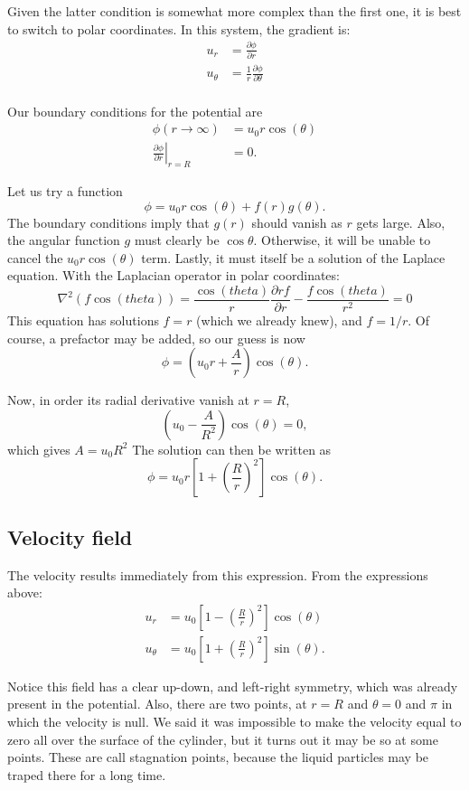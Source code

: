 Given the latter condition is somewhat more complex than the first
one, it is best to switch to polar coordinates. In
this system, the gradient is:
\begin{align}
u_r &= \frac{\partial\phi}{\partial r}\\
u_\theta &= \frac{1}{r} \frac{\partial\phi}{\partial \theta}\\
\end{align}


Our boundary conditions for the potential are
\begin{align}
  \phi(r \to \infty ) &=  u_0 r \cos(\theta)  \\
  \left. \frac{\partial\phi}{\partial r} \right|_{r = R } &= 0  .
\end{align}

Let us try a function
\[
\phi =  u_0 r \cos(\theta)  + f(r) g(\theta) .
\]
The boundary conditions imply that $g(r)$ should vanish as $r$ gets
large. Also, the angular function $g$ must clearly be
$\cos\theta$. Otherwise, it will be unable to cancel the $u_0
r \cos(\theta)$ term. Lastly, it must itself be a solution of the
Laplace equation. With the Laplacian operator in
polar coordinates:
\[
\nabla^2 (f \cos(theta ) ) =
\frac{ \cos(theta ) }{r} \frac{\partial r f}{\partial r} -
\frac{ f \cos(theta ) }{r^2} = 0
\]
This equation has solutions $f=r$ (which we already knew), and
$f=1/r$. Of course, a prefactor may be added, so our guess is now
\[
\phi = \left( u_0 r + \frac{A}{r} \right) \cos(\theta) .
\]

Now, in order its radial derivative vanish at $r=R$,
\[
 \left ( u_0  - \frac{A}{R^2} \right) \cos(\theta) = 0 ,
\]
which gives $A=u_0 R^2 $ The solution can then be written as
\[
\phi = u_0 r \left[ 1 + \left( \frac{R}{r}\right)^2 \right] \cos(\theta) .
\]

\subsection{Velocity field}

The velocity results immediately from this expression. From the
expressions above:
\begin{align}
u_r     &=   u_0  \left[ 1 - \left( \frac{R}{r}\right)^2 \right] \cos(\theta) \\
u_\theta &=   u_0  \left[ 1 + \left( \frac{R}{r}\right)^2 \right] \sin(\theta) .
\end{align}

Notice this field has a clear up-down, and left-right symmetry, which
was already present in the potential. Also, there are two points, at
$r=R$ and $\theta=0$ and $\pi$ in which the velocity is null. We said
it was impossible to make the velocity equal to zero all over the
surface of the cylinder, but it turns out it may be so at some
points. These are call stagnation points, because the liquid particles
may be traped there for a long time.


